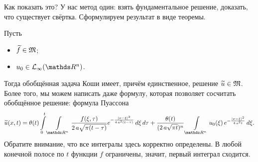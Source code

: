 Как показать это? У нас метод один: взять фундаментальное решение, доказать, что существует свёртка. Сформулируем результат в виде теоремы.
\begin{The}
  Пусть 
\begin{itemize}
\item $\widetilde{f}{}\in\mathfrak M$;
\item $u_0\in\L_\infty(\R^n)$.
\end{itemize}
Тогда обобщённая задача Коши имеет, причём единственное, решение $\widetilde{u}{}\in\mathfrak M$. Более того, мы можем написать даже формулу, которая позволяет сосчитать обобщённое решение: формула Пуассона
\begin{equation}\label{OBOBTemp}
  \Til u(x,t) = \theta(t)\int\limits_0^t\Gint{\R^n}
    \frac{f(\xi,\tau)}{2\,a\sqrt{\pi(t-\tau)}}
    e^{-\frac{|x-\xi|^2}{4\,a^2(t-\tau)}}\,d\xi\,d\tau + 
    \frac{\theta(t)}{(2\,a\sqrt{\pi t})^n}
    \Gint{\R^n} u_0(\xi)\,e^{-\frac{|x-\xi|^2}{4\,a^2t}}\,d\xi.
\end{equation}
Обратите внимание, что все интегралы здесь корректно определены. В любой конечной полосе по $t$ функции $f$ ограничены, значит, первый интеграл сходится.
\end{The}
